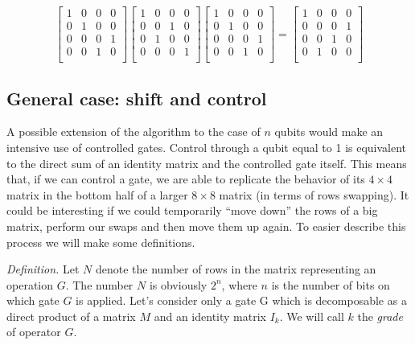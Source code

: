 \begin{equation*}
\begin{bmatrix}
1 & 0 & 0 & 0 \\
0 & 1 & 0 & 0 \\
0 & 0 & 0 & 1 \\
0 & 0 & 1 & 0 \\
\end{bmatrix}
\begin{bmatrix}
1 & 0 & 0 & 0 \\
0 & 0 & 1 & 0 \\
0 & 1 & 0 & 0 \\
0 & 0 & 0 & 1 \\
\end{bmatrix}
\begin{bmatrix}
1 & 0 & 0 & 0 \\
0 & 1 & 0 & 0 \\
0 & 0 & 0 & 1 \\
0 & 0 & 1 & 0 \\
\end{bmatrix}
=
\begin{bmatrix}
1 & 0 & 0 & 0 \\
0 & 0 & 0 & 1 \\
0 & 0 & 1 & 0 \\
0 & 1 & 0 & 0 \\
\end{bmatrix}
\end{equation*}

\subsection{General case: shift and control}
\label{sec:shift_and_control}

A possible extension of the algorithm to the case of $n$ qubits would make an intensive use of controlled gates. Control through a qubit equal to 1 is equivalent to the direct sum of an identity matrix and the controlled gate itself. This means that, if we can control a gate, we are able to replicate the behavior of its $4 \times 4$ matrix in the bottom half of a larger $8 \times 8$ matrix (in terms of rows swapping). It could be interesting if we could temporarily ``move down'' the rows of a big matrix, perform our swaps and then move them up again. To easier describe this process we will make some definitions.

\bigskip

\textit{Definition.} Let $N$ denote the number of rows in the matrix representing an operation $G$. The number $N$ is obviously $2^n$, where $n$ is the number of bits on which gate $G$ is applied. Let's consider only a gate G which is decomposable as a direct product of a matrix $M$ and an identity matrix $I_k$. We will call $k$ the \textit{grade} of operator $G$.

